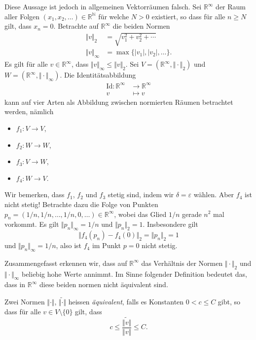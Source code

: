 \documentclass[../main.tex]{subfiles}
\begin{document}
Diese Aussage ist jedoch in allgemeinen Vektorräumen falsch.
Sei $\mathbb{R}^{\infty}$ der Raum aller Folgen
$(x_{1}, x_{2}, \dots) \in \mathbb{R}^{\mathbb{N}}$
für welche $N > 0$ existiert, so dass für alle $n \geq N$
gilt, dass $x_n = 0$.
Betrachte auf $\mathbb{R}^{\infty}$ die beiden Normen
\begin{align*}
  \Vert v \Vert_2 & = \sqrt{v_1^2 + v_2^2 + \cdots} \\
  \Vert v \Vert_{\infty} &= \max \{|v_1|, |v_2|, \dots\}.
\end{align*}
Es gilt für alle $v \in \mathbb{R}^{\infty}$,
dass $\Vert v \Vert_{\infty} \leq \Vert v \Vert_2$.
Sei $V = (\mathbb{R}^{\infty}, \Vert \cdot \Vert_2)$
und $W = (\mathbb{R}^{\infty}, \Vert \cdot \Vert_{\infty})$.
Die Identitätsabbildung
\begin{align*}
  \text{Id} \colon \mathbb{R}^{\infty} & \to \mathbb{R}^{\infty} \\
  v & \mapsto v
\end{align*}
kann auf vier Arten als Abbildung zwischen normierten Räumen
betrachtet werden, nämlich
\begin{itemize}
  \item $f_1 \colon V \to V$,
  \item $f_2 \colon W \to W$,
  \item $f_3 \colon V \to W$,
  \item $f_4 \colon W \to V$.
\end{itemize}
Wir bemerken, dass $f_1$, $f_2$ und $f_3$ stetig
sind, indem wir $\delta = \varepsilon$ wählen.
Aber $f_4$ ist nicht stetig!
Betrachte dazu die Folge von Punkten
$p_n = (1/n, 1/n, \dots, 1/n, 0, \dots) \in \mathbb{R}^{\infty}$,
wobei das Glied $1/n$ gerade $n^2$ mal vorkommt.
Es gilt $\Vert p_n \Vert_{\infty} = 1/n$
und $\Vert p_n \Vert_{2} = 1$.
Insbesondere gilt
\[
  \Vert f_4(p_n) - f_4(0) \Vert_2 = \Vert p_n \Vert_2 = 1
\]
und $\Vert p_n \Vert_{\infty} = 1/n$,
also ist $f_4$ im Punkt $p = 0$ nicht stetig.

Zusammengefasst erkennen wir, dass auf $\mathbb{R}^{\infty}$
das Verhältnis der Normen $\Vert \cdot \Vert_2$
und $\Vert \cdot \Vert_{\infty}$ beliebig hohe Werte annimmt.
Im Sinne folgender Definition bedeutet das, dass in
$\mathbb{R}^{\infty}$ diese beiden normen nicht äquivalent sind.

\begin{definition}
  Zwei Normen $\Vert \cdot \Vert$, $\widetilde{\Vert \cdot \Vert}$
  heissen \emph{äquivalent},
  falls es Konstanten $0 < c \leq C$ gibt,
  so dass für alle $v \in V \setminus \{0\}$ gilt, dass
  \[
    c \leq \frac{\widetilde{\Vert v \Vert}}{\Vert v \Vert} \leq C.
  \]
\end{definition}
\end{document}
